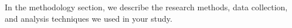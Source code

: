 In the methodology section, we describe the research methods, data collection, and analysis techniques we used in your study.
